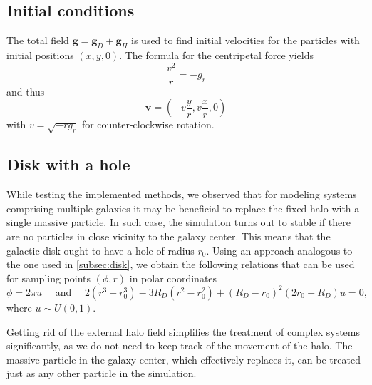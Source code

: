 \subsection{Initial conditions}
The total field $\mathbf{g} = \mathbf{g}_D + \mathbf{g}_H$ is used to find initial velocities for the particles with initial positions $(x, y, 0)$.
The formula for the centripetal force yields
\begin{equation*}
    \frac{v^2}{r} = -g_r
\end{equation*}
and thus
\begin{equation*}
    \mathbf{v} = \left(-v \frac{y}{r}, v\frac{x}{r}, 0\right)
\end{equation*}
with $v = \sqrt{- r g_r}$
for counter-clockwise rotation.

\subsection{Disk with a hole}\label{subsec:disk-with-hole}
While testing the implemented methods, we observed that for modeling systems comprising multiple galaxies it may be beneficial to replace the fixed halo with a single massive particle.
In such case, the simulation turns out to stable if there are no particles in close vicinity to the galaxy center.
This means that the galactic disk ought to have a hole of radius $r_0$.
Using an approach analogous to the one used in \autoref{subsec:disk}, we obtain the following relations that can be used for sampling points $(\phi, r)$ in polar coordinates
\begin{equation*}
    \phi = 2\pi u \quad \text{ and } \quad 2(r^3 - r_0^3)-3R_D(r^2 - r_0^2) + (R_D-r_0)^2(2r_0 + R_D)u = 0,
\end{equation*}
where $u \sim U(0, 1)$.

Getting rid of the external halo field simplifies the treatment of complex systems significantly, as we do not need to keep track of the movement of the halo.
The massive particle in the galaxy center, which effectively replaces it, can be treated just as any other particle in the simulation.